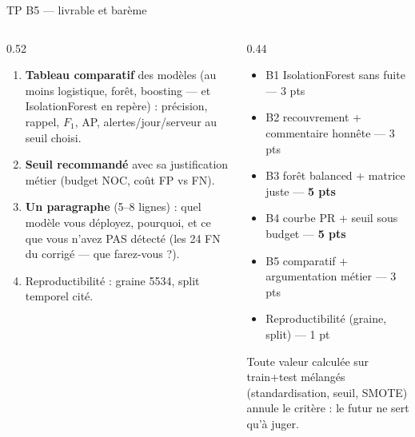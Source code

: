 \begin{frame}{TP B5 --- livrable et barème}
\begin{columns}[t]
\begin{column}{0.52\textwidth}
\begin{abox}[À rendre]
\begin{enumerate}
\item \textbf{Tableau comparatif} des modèles (au moins
logistique, forêt, boosting --- et IsolationForest en repère) :
précision, rappel, $F_1$, AP, alertes/jour/serveur au seuil choisi.
\item \textbf{Seuil recommandé} avec sa justification métier
(budget NOC, coût FP vs FN).
\item \textbf{Un paragraphe} (5--8 lignes) : quel modèle vous
déployez, pourquoi, et ce que vous n'avez PAS détecté (les 24 FN
du corrigé --- que farez-vous ?).
\item Reproductibilité : graine 5534, split temporel cité.
\end{enumerate}
\end{abox}
\end{column}
\begin{column}{0.44\textwidth}
\begin{kbox}
\begin{itemize}
\item B1 IsolationForest sans fuite --- 3 pts
\item B2 recouvrement + commentaire honnête --- 3 pts
\item B3 forêt balanced + matrice juste --- \textbf{5 pts}
\item B4 courbe PR + seuil sous budget --- \textbf{5 pts}
\item B5 comparatif + argumentation métier --- 3 pts
\item Reproductibilité (graine, split) --- 1 pt
\end{itemize}
\end{kbox}
\begin{wbox}[Fuite = 0 au critère B3]
Toute valeur calculée sur train+test mélangés (standardisation,
seuil, SMOTE) annule le critère : le futur ne sert qu'à juger.
\end{wbox}
\end{column}
\end{columns}
\end{frame}
